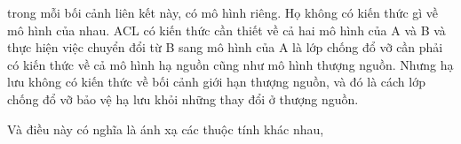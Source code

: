 \documentclass{article} %
\begin{document}



trong mỗi bối cảnh liên kết này, có mô hình riêng. Họ không có kiến thức gì về mô hình của nhau.
ACL có kiến thức cần thiết về cả hai mô hình của A và B và thực hiện việc chuyển đổi từ B sang mô hình của A là lớp chống đổ vỡ cần phải có kiến thức về cả mô hình hạ nguồn cũng như mô hình thượng nguồn.
Nhưng hạ lưu không có kiến thức về bối cảnh giới hạn thượng nguồn, và đó là cách lớp chống đổ vỡ bảo vệ hạ lưu khỏi những thay đổi ở thượng nguồn.









Và điều này có nghĩa là ánh xạ các thuộc tính khác nhau,
\end{document}
